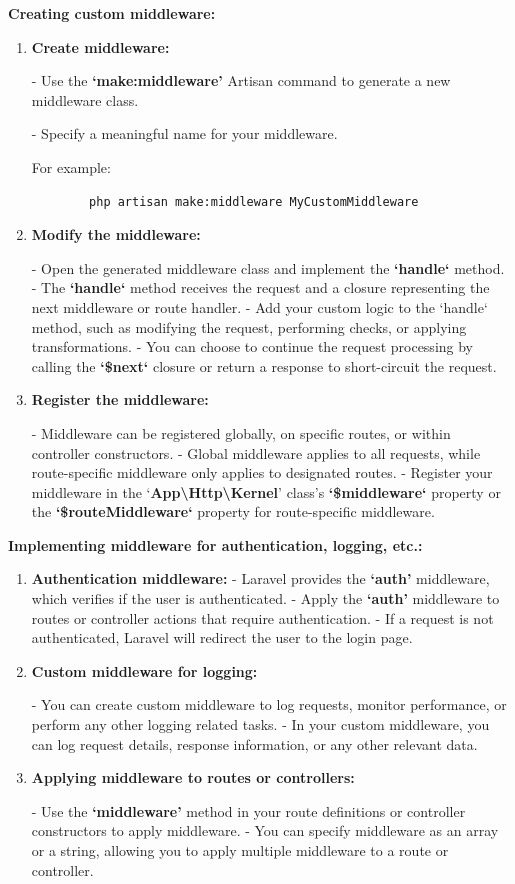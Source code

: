 \textbf{Creating custom middleware:}
\begin{enumerate}
\item \textbf{Create middleware:}
   
- Use the \textbf{`make:middleware'} Artisan command to generate a new middleware class.
  
- Specify a meaningful name for your middleware. 
   
   For example:
    \begin{verbatim}   
        php artisan make:middleware MyCustomMiddleware
    \end{verbatim}
     

\item \textbf{Modify the middleware:}

- Open the generated middleware class and implement the \textbf{`handle`} method.
   - The \textbf{`handle`} method receives the request and a closure representing the next middleware or route handler.
   - Add your custom logic to the `handle` method, such as modifying the request, performing checks, or applying transformations.
   - You can choose to continue the request processing by calling the \textbf{`\$next`} closure or return a response to short-circuit the request.

\item \textbf{Register the middleware:}
   
- Middleware can be registered globally, on specific routes, or within controller constructors.
   - Global middleware applies to all requests, while route-specific middleware only applies to designated routes.
   - Register your middleware in the `\textbf{App\textbackslash Http\textbackslash Kernel}' class's \textbf{`\$middleware`} property or the \textbf{`\$routeMiddleware`} property for route-specific middleware.
\end{enumerate}
\textbf{Implementing middleware for authentication, logging, etc.:}
\begin{enumerate}
\item \textbf{Authentication middleware:}
    - Laravel provides the \textbf{`auth'} middleware, which verifies if the user is authenticated.
    - Apply the \textbf{`auth'} middleware to routes or controller actions that require authentication.
    - If a request is not authenticated, Laravel will redirect the user to the login page.
    
\item \textbf{Custom middleware for logging:}
    
- You can create custom middleware to log requests, monitor performance, or perform any other logging related tasks.
    - In your custom middleware, you can log request details, response information, or any other relevant data.
    
\item \textbf{Applying middleware to routes or controllers:}
    
- Use the \textbf{`middleware'} method in your route definitions or controller constructors to apply middleware.
    - You can specify middleware as an array or a string, allowing you to apply multiple middleware to a route or controller.
\end{enumerate}
